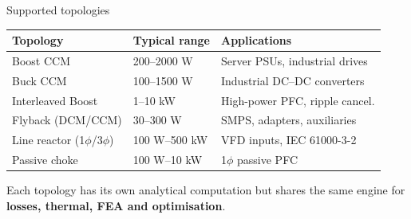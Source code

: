 \documentclass[11pt, aspectratio=169]{beamer}
\begin{document}
\begin{frame}{Supported topologies}
  \begin{table}
    \centering\small
    \begin{tabular}{@{}lll@{}}
      \toprule
      \textbf{Topology} & \textbf{Typical range} & \textbf{Applications} \\
      \midrule
      Boost CCM & 200--2000 W & Server PSUs, industrial drives \\
      Buck CCM & 100--1500 W & Industrial DC--DC converters \\
      Interleaved Boost & 1--10 kW & High-power PFC, ripple cancel.\\
      Flyback (DCM/CCM) & 30--300 W & SMPS, adapters, auxiliaries \\
      Line reactor (1$\phi$/3$\phi$) & 100 W--500 kW & VFD inputs, IEC 61000-3-2 \\
      Passive choke & 100 W--10 kW & 1$\phi$ passive PFC \\
      \bottomrule
    \end{tabular}
  \end{table}
  \medskip

  Each topology has its own analytical computation but shares the
  same engine for \textbf{losses, thermal, FEA and optimisation}.
\end{frame}
\end{document}
